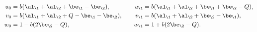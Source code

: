 \begin{equation}
\begin{aligned}
u_0=&\;b(\al_\1+\al_\2+\be_\1-\be_\2),\\
v_0=&\;b(\al_\1+\al_\2+Q-\be_\1-\be_\2),\\
w_0=&\;1-b(2\be_\2-Q),
\end{aligned}
\qquad
\begin{aligned}
u_\1=&\;b(\al_\1+\al_\2+\be_\1+\be_\2-Q),\\
v_\1=&\;b(\al_\1+\al_\2+\be_\2-\be_\1),\\
w_\1=&\;1+b(2\be_\2-Q).
\end{aligned}
\end{equation}

